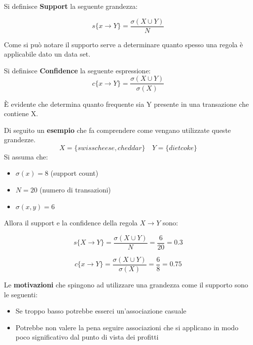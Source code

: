 \begin{defn}
	Si definisce \textbf{Support} la seguente grandezza: 
	
	\[s\{x \rightarrow Y\} = \frac{\sigma(X \cup Y)}{N}\]
\end{defn}
Come si può notare il supporto serve a determinare quanto spesso una regola è  applicabile dato un data set.
\begin{defn}
	Si definisce \textbf{Confidence} la seguente espressione: 	
	\[c\{x \rightarrow Y\} = \frac{\sigma(X \cup Y)}{\sigma(X)}\]
\end{defn}
\`E evidente che determina quanto frequente sia Y presente in una transazione che contiene X.

Di seguito un \textbf{esempio} che fa comprendere come vengano utilizzate queste grandezze. 
\[X = \{swiss cheese, cheddar\} \quad Y = \{diet coke\}\]
Si assuma che:
\begin{itemize}
	\item $\sigma(x) = 8$ (support count)
	\item $N = 20$ (numero di transazioni)
	\item $\sigma(x,y) = 6$ 
\end{itemize}
Allora il support e la confidence della regola $X \rightarrow Y$ sono:

\[s\{X \rightarrow Y\} = \frac{\sigma(X \cup Y)}{N} = \frac{6}{20} = 0.3\]

\[c\{x \rightarrow Y\} = \frac{\sigma(X \cup Y)}{\sigma(X)} = \frac{6}{8} = 0.75\]

Le \textbf{motivazioni} che spingono ad utilizzare una grandezza come il supporto sono le seguenti:
\begin{itemize}
	\item Se troppo basso potrebbe esserci un'associazione casuale
	\item Potrebbe non valere la pena seguire associazioni che si applicano in modo poco significativo dal punto di vista dei profitti 
\end{itemize}

